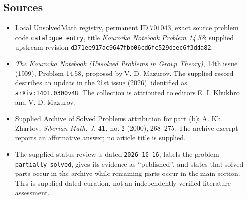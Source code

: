 \documentclass[11pt]{article}
\begin{document}
\subsection{Sources}
\begin{itemize}
\item Local UnsolvedMath registry, permanent ID \(701043\), exact source problem code \texttt{catalogue entry}, title \emph{Kourovka Notebook Problem 14.58}; supplied upstream revision \texttt{d371ee917ac9647fbb06cd6fc529deec6f3dda82}.
\item \emph{The Kourovka Notebook (Unsolved Problems in Group Theory)}, 14th issue (1999), Problem 14.58, proposed by V. D. Mazurov. The supplied record describes an update in the 21st issue (2026), identified as \texttt{arXiv:1401.0300v48}. The collection is attributed to editors E. I. Khukhro and V. D. Mazurov.
\item Supplied Archive of Solved Problems attribution for part (b): A. Kh. Zhurtov, \emph{Siberian Math. J.} \textbf{41}, no. 2 (2000), 268--275. The archive excerpt reports an affirmative answer; no article title is supplied.
\item The supplied status review is dated \texttt{2026-10-16}, labels the problem \texttt{partially\_solved}, gives its evidence as ``published'', and states that solved parts occur in the archive while remaining parts occur in the main section. This is supplied dated curation, not an independently verified literature assessment.
\end{itemize}
\end{document}

